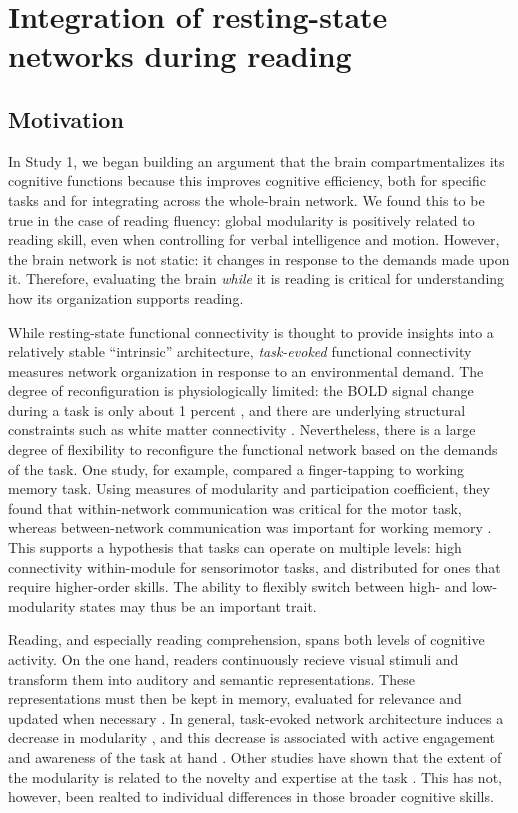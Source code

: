 \chapter{Integration of resting-state networks during reading}

\section{Motivation}

In Study 1, we began building an argument that the brain compartmentalizes its cognitive functions because this improves cognitive efficiency, both for specific tasks and for integrating across the whole-brain network. We found this to be true in the case of reading fluency: global modularity is positively related to reading skill, even when controlling for verbal intelligence and motion. However, the brain network is not static: it changes in response to the demands made upon it. Therefore, evaluating the brain \textit{while} it is reading is critical for understanding how its organization supports reading. 

While resting-state functional connectivity is thought to provide insights into a relatively stable ``intrinsic'' architecture, \textit{task-evoked} functional connectivity measures network organization in response to an environmental demand. The degree of reconfiguration is physiologically limited: the BOLD signal change during a task is only about 1 percent \citep{Fox2007}, and there are underlying structural constraints such as white matter connectivity \citep{Sui2014}. Nevertheless, there is a large degree of flexibility to reconfigure the functional network based on the demands of the task. One study, for example, compared a finger-tapping to working memory task. Using measures of modularity and participation coefficient, they found that within-network communication was critical for the motor task, whereas between-network communication was important for working memory \citep{Cohen2016}. This supports a hypothesis that tasks can operate on multiple levels: high connectivity within-module for sensorimotor tasks, and distributed for ones that require higher-order skills. The ability to flexibly switch between high- and low-modularity states may thus be an important trait.

Reading, and especially reading comprehension, spans both levels of cognitive activity. On the one hand, readers continuously recieve visual stimuli and transform them into auditory and semantic representations. These representations must then be kept in memory, evaluated for relevance and updated when necessary \citep{Maguire1999}. In general, task-evoked network architecture induces a decrease in modularity \citep{Cole2014}, and this decrease is associated with active engagement and awareness of the task at hand \citep{Godwin2015}. Other studies have shown that the extent of the modularity is related to the novelty and expertise at the task \citep{Bassett2015}. This has not, however, been realted to individual differences in those broader cognitive skills.

